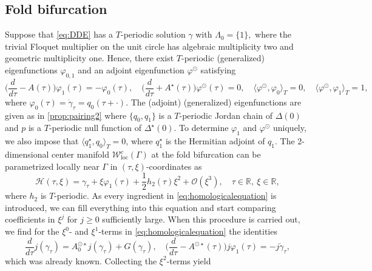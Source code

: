 \documentclass[english]{myarticle}
\DeclareMathOperator{\loc}{loc}
\begin{document}
\begin{sloppypar}
\subsection{Fold bifurcation} \label{subsec:fold}
Suppose that \eqref{eq:DDE} has a $T$-periodic solution $\gamma$ with $\Lambda_0 = \{ 1 \},$ where the trivial Floquet multiplier on the unit circle has algebraic multiplicity two and geometric multiplicity one. Hence, there exist $T$-periodic (generalized) eigenfunctions $\varphi_{0,1}$ and an adjoint eigenfunction $\varphi^\odot$ satisfying
\begin{equation*} 
    \bigg( \frac{d}{d\tau} - A(\tau)\bigg)\varphi_1(\tau)=
    -\varphi_0(\tau), \quad \bigg( \frac{d}{d\tau} + A^\star(\tau)\bigg)\varphi^\odot(\tau)=0, \quad \langle \varphi^\odot, \varphi_0 \rangle_T = 0, \quad \langle \varphi^\odot, \varphi_1 \rangle_T = 1,
\end{equation*}
where $\varphi_0(\tau) = \dot{\gamma}_\tau = q_0(\tau+\cdot)$. The (adjoint) (generalized) eigenfunctions are given as in \cref{prop:pairing2} where $\{q_0,q_1\}$ is a $T$-periodic Jordan chain of $\Delta(0)$ and $p$ is a $T$-periodic null function of $\Delta^\star(0)$. To determine $\varphi_1$ and $\varphi^\odot$ uniquely, we also impose that $\langle q_1^\star,q_0 \rangle_T = 0$, where $q_1^\star$ is the Hermitian adjoint of $q_1$. The 2-dimensional center manifold $\mathcal{W}_{\loc}^{c}(\Gamma)$ at the fold bifurcation can be parametrized locally near $\Gamma$ in $(\tau,\xi)$-coordinates as
\begin{equation*}
    \mathcal{H}(\tau,\xi) = \gamma_\tau + \xi \varphi_1(\tau) + \frac{1}{2}h_2(\tau) \xi^2 + \mathcal{O}(\xi^3), \quad \tau \in \mathbb{R}, \ \xi \in \mathbb{R},
\end{equation*}
where $h_2$ is $T$-periodic. As every ingredient in \eqref{eq:homologicalequation} is introduced, we can fill everything into this equation and start comparing coefficients in $\xi^j$ for $j \geq 0$ sufficiently large. When this procedure is carried out, we find for the $\xi^0$- and $\xi^1$-terms in \eqref{eq:homologicalequation} the identities
\begin{equation*}
    \frac{d}{d\tau} j({\gamma}_\tau) = A_0^{\odot \star} j(\gamma_\tau) + G(\gamma_\tau), \quad \bigg(\frac{d}{d \tau} - A^{\odot \star}(\tau) \bigg)j\varphi_1(\tau) = -j\dot{\gamma}_\tau,
\end{equation*}
which was already known. Collecting the $\xi^2$-terms yield
\begin{equation*}

\end{equation*}
\end{sloppypar}
\end{document}

